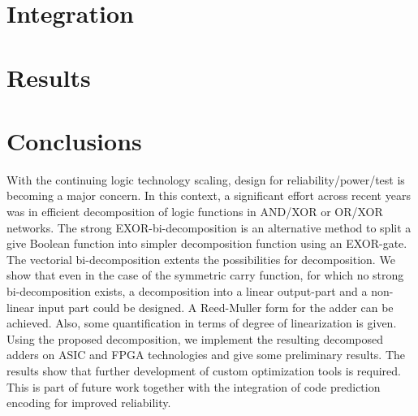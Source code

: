 \documentclass[12pt]{toptesi}
\begin{document}
\chapter{Integration} %

\chapter{Results}

\chapter{Conclusions}

With the continuing logic technology scaling, design for reliability/power/test is becoming a major concern. In this context, a significant effort across recent years was in efficient decomposition of logic functions in AND/XOR or OR/XOR networks.
The strong EXOR-bi-decomposition is an alternative method to split a
give Boolean function into simpler decomposition function using an EXOR-gate.
The vectorial bi-decomposition extents the possibilities for decomposition. We show that even in
the case of the symmetric carry function, for which no strong bi-decomposition
exists, a decomposition into a linear output-part and a non-linear input part
could be designed. A Reed-Muller form for the adder can be achieved. Also, some quantification in terms of degree of linearization is given. Using the proposed decomposition, we implement the resulting decomposed adders on ASIC and FPGA technologies and give some preliminary results. The results show that further development of custom optimization tools is required. This is part of future work together with the integration of code prediction encoding for improved reliability.




\end{document}
